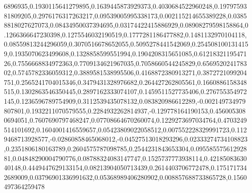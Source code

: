 6896935,0.1930115641279895,0.1639445873929373,0.4030684522960248,0.1979759381809205,0.2976176317263217,0.09539005995338173,0.002115214655389228,0.03858818027627073,0.08434950037394695,0.03174422415886929,0.08908279598158864,0.1266366647230398,0.1275546032190519,0.1777281186477882,0.1481132970104118,0.08559813244296059,0.3070516678652055,0.5095278441542069,0.2545081001314159,0.1935070623499608,0.1328858599551994,0.1904208315651085,0.6121832119547126,0.7556668834972363,0.7709134621967035,0.7058660544245829,0.656952024178302,0.5745782336059312,0.3889581538995506,0.4168872380913271,0.3872721099204751,0.2565241704015346,0.3479431328976682,0.264427262805561,0.1660886158348515,0.1302863546350445,0.2897162333074107,0.1459511527735406,0.276755354972145,0.1236596789754909,0.3112539435078132,0.083820986612289,-0.002149734979807801,0.1932211070579555,0.2284932262814937,-0.129778164190153,0.4560053080694051,0.7607690797468247,0.07708664670260074,0.1229273697034764,0.4703249514101692,0.1604001416559657,0.05423809022058512,0.007552228329991723,0.1129468713928577,-0.02860858465068012,-0.04527513018293296,0.02333274734108823,0.2351806180163789,0.2604575787098785,0.2544231843653304,0.09558557561292881,0.04848290004790776,0.08788324083147747,0.1525737773938114,0.4218508363040148,0.4449447629133154,0.08213904050713439,0.2614403706772478,0.1751717342689009,0.03796901336991632,0.05368989406280902,0.008857688733865728,0.1560497364259478
